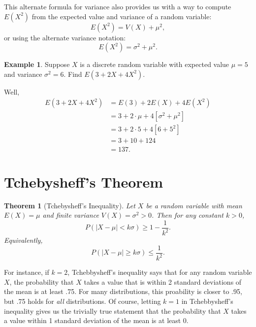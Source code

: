 \documentclass[
]{book}
\newtheorem{theorem}{Theorem}[chapter]
\theoremstyle{definition}
\theoremstyle{definition}
\newtheorem{example}{Example}[chapter]
\theoremstyle{definition}
\theoremstyle{definition}
\theoremstyle{remark}
\begin{document}
This alternate formula for variance also provides us with a way to compute \(E(X^2)\) from the expected value and variance of a random variable: \[E(X^2) = V(X) + \mu^2,\] or using the alternate variance notation:
\[E(X^2) = \sigma^2 + \mu^2.\]

\begin{example}
Suppose \(X\) is a discrete random variable with expected value \(\mu = 5\) and variance \(\sigma^2 = 6\).
Find \(E(3+2X+4X^2)\).

Well, \begin{align*}
E(3 + 2X + 4X^2) &= E(3) + 2E(X) + 4E(X^2) \\
                 &= 3 + 2\cdot \mu + 4[\sigma^2+\mu^2] \\
                 &= 3 + 2 \cdot 5 + 4[6 + 5^2] \\
                 &= 3 + 10 + 124 \\
                 &= 137.
\end{align*}
\end{example}

\section{Tchebysheff's Theorem}\label{tchebysheffs-theorem}

\begin{theorem}[Tchebysheff's Inequality]
\protect\hypertarget{thm:tcheby}{}\label{thm:tcheby}Let \(X\) be a random variable with mean \(E(X) = \mu\) and finite variance \(V(X) = \sigma^2 > 0\). Then for any constant \(k > 0\),
\[P(|X - \mu| < k\sigma ) \geq 1 - \frac{1}{k^2}.\]
Equivalently, \[P(|X - \mu| \geq k\sigma) \leq \frac{1}{k^2}.\]
\end{theorem}

For instance, if \(k = 2\), Tchebbysheff's inequality says that for any random variable \(X\), the probability that \(X\) takes a value that is within 2 standard deviations of the mean is at least .75. For many distributions, this proability is closer to .95, but .75 holds for \emph{all} distributions.
Of course, letting \(k = 1\) in Tchebbysheff's inequality gives us the trivially true statement that the probability that \(X\) takes a value within 1 standard deviation of the mean is at least 0.
\end{document}
